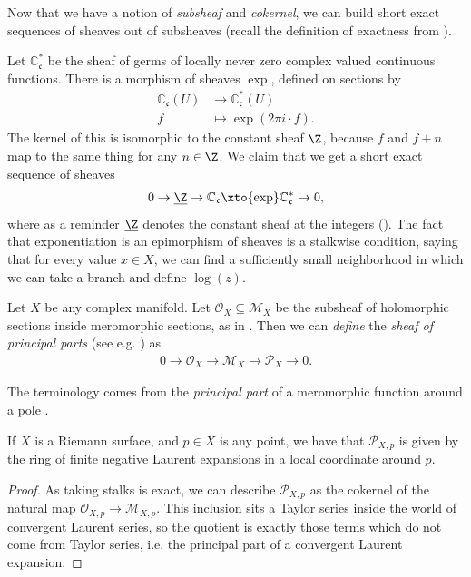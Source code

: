 \documentclass[11pt]{amsart}
\begin{document}
Now that we have a notion of \emph{subsheaf} and \emph{cokernel}, we can build short exact sequences of sheaves out of subsheaves (recall the definition of exactness from ).

\begin{example} Let $\mathbb{C}_{\mathfrak{c}}^\ast$ be the sheaf of germs of locally never zero complex valued continuous functions. There is a morphism of sheaves $\exp$, defined on sections by
\begin{align*}
    \mathbb{C}_{\mathfrak{c}}(U) &\to \mathbb{C}_{\mathfrak{c}}^\ast(U) \\
    f &\mapsto \exp(2\pi i \cdot f).
\end{align*}
The kernel of this is isomorphic to the constant sheaf $\Z$, because $f$ and $f + n$ map to the same thing for any $n \in \Z$. We claim that we get a short exact sequence of sheaves
\begin{align*}
    0 \to \underline{\Z} \to \mathbb{C}_{\mathfrak{c}} \xto{\exp} \mathbb{C}_{\mathfrak{c}}^\ast \to 0,
\end{align*}
where as a reminder $\underline{\Z}$ denotes the constant sheaf at the integers ().
The fact that exponentiation is an epimorphism of sheaves is a stalkwise condition, saying that for every value $x\in X$, we can find a sufficiently small neighborhood in which we can take a branch and define $\log(z)$.
\end{example}

\begin{example} Let $X$ be any complex manifold. Let $\mathcal{O}_X \subseteq \mathcal{M}_X$ be the subsheaf of holomorphic sections inside meromorphic sections, as in . Then we can \emph{define} the \emph{sheaf of principal parts} (see e.g. \cite[(4.2)]{gunningTopicsFunctionTheory2018}) as
\begin{align*}
    0 \to \mathcal{O}_X \to \mathcal{M}_X \to \mathcal{P}_X \to 0.
\end{align*}
\end{example}

The terminology comes from the \emph{principal part} of a meromorphic function around a pole \cite[p.~75]{steinComplexAnalysis2003}.

\begin{proposition} If $X$ is a Riemann surface, and $p\in X$ is any point, we have that $\mathcal{P}_{X,p}$ is given by the ring of finite negative Laurent expansions in a local coordinate around $p$.
\end{proposition}
\begin{proof} As taking stalks is exact, we can describe $\mathcal{P}_{X,p}$ as the cokernel of the natural map $\mathcal{O}_{X,p} \to \mathcal{M}_{X,p}$. This inclusion sits a Taylor series inside the world of convergent Laurent series, so the quotient is exactly those terms which do not come from Taylor series, i.e. the principal part of a convergent Laurent expansion.
\end{proof}
\end{document}
